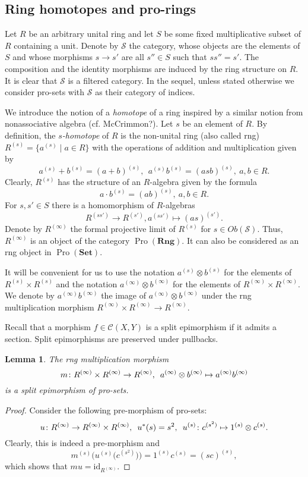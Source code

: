 \documentclass{article}
\newtheorem{lemma}{Lemma}
\newcommand{\rar}{\rightarrow}
\newcommand{\Set}{\mathbf{Set}}
\newcommand{\Rng}{\mathbf{Rng}}
\DeclareMathOperator{\Pro}{Pro}
\begin{document}
\subsection{Ring homotopes and pro-rings}
Let $R$ be an arbitrary unital ring and let \(S\) be some fixed multiplicative subset of $R$ containing a unit. Denote by $\mathcal{S}$ the category, whose objects are the elements of \(S\) and whose morphisms \(s \rar s'\) are all \(s'' \in S\) such that \(ss'' = s'\). The composition and the identity morphisms are induced by the ring structure on $R$. It is clear that $\mathcal{S}$ is a filtered category. In the sequel, unless stated otherwise we consider pro-sets with \(\mathcal S\) as their category of indices.

We introduce the notion of a {\it homotope} of a ring inspired by a similar notion from nonassociative algebra (cf. McCrimmon?). Let $s$ be an element of $R$.  By definition, the {\it \(s\)-homotope} of \(R\) is the non-unital ring (also called rng) \(R^{(s)} = \{a^{(s)} \mid a \in R\}\) with the operations of addition and multiplication given by
\[ a^{(s)} + b^{(s)} = (a + b)^{(s)},\ \ a^{(s)} b^{(s)} = (asb)^{(s)},\ a, b\in R.\]
Clearly, $R^{(s)}$ has the structure of an \(R\)-algebra given by the formula \[a \cdot b^{(s)} = (ab)^{(s)},\ a, b \in R.\] For \(s, s' \in S\) there is a homomorphism of \(R\)-algebras \[R^{(ss')} \rar R^{(s')}, a^{(ss')} \mapsto (as)^{(s')}.\]
Denote by \(R^{(\infty)}\) the formal projective limit of \(R^{(s)}\) for \(s \in Ob(\mathcal S)\). Thus, $R^{(\infty)}$ is an object of the category $\Pro(\Rng)$. It can also be considered as an rng object in \(\Pro(\Set)\). 

It will be convenient for us to use the notation \(a^{(s)} \otimes b^{(s)}\) for the elements of \(R^{(s)} \times R^{(s)}\) and the notation \(a^{(\infty)} \otimes b^{(\infty)}\) for the elements of \(R^{(\infty)} \times R^{(\infty)}\). We denote by $a^{(\infty)} b^{(\infty)}$ the image of \(a^{(\infty)} \otimes b^{(\infty)}\) under the rng multiplication morphism  \(R^{(\infty)} \times R^{(\infty)} \rar R^{(\infty)}\).

Recall that a morphism \(f \in \mathcal C(X, Y)\) is a split epimorphism if it admits a section. Split epimorphisms are preserved under pullbacks.

\begin{lemma}\label{RingGeneration}
The rng multiplication morphism
\[m \colon R^{(\infty)} \times R^{(\infty)} \rar R^{(\infty)}, \enskip a^{(\infty)} \otimes b^{(\infty)} \mapsto a^{(\infty)} b^{(\infty)}\]
is a split epimorphism of pro-sets.
\end{lemma}
\begin{proof}
Consider the following pre-morphism of pro-sets:
\[u \colon R^{(\infty)} \rar R^{(\infty)} \times R^{(\infty)}, \enskip u^*(s) = s^2, \enskip u^{(s)} \colon c^{(s^2)} \mapsto 1^{(s)} \otimes c^{(s)}.\]
Clearly, this is indeed a pre-morphism and
\[m^{(s)}\bigl(u^{(s)}\bigl(c^{(s^2)}\bigr)\bigr) = 1^{(s)} c^{(s)} = (sc)^{(s)},\]
which shows that $mu = \mathrm{id}_{R^{(\infty)}}$.
\end{proof}
\end{document}
